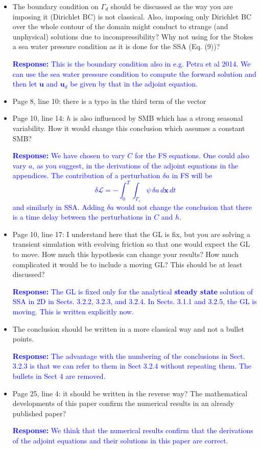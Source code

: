\documentclass{article}
\newcommand{\response}{\noindent{{\bf Response:} }}
\newcommand{\agreet}{\response  {\color{blue}{The correction has been made.}} }
\newcommand{\colorthree}{blue}
\newcommand{\revth}[1]{\noindent \textcolor{\colorthree}{{\bf Response:} #1}}
\begin{document}
\begin{itemize}
\revth{We have added `advection equation' and the boundary condition on $\Gamma_w$.}

\item The boundary condition on $\Gamma_d$ should be discussed as the way you are imposing it (Dirichlet BC) is not classical. Also, imposing only Dirichlet BC over the whole contour of the domain might conduct to strange (and unphysical) solutions due to incompressibility? Why not using for the Stokes a sea water pressure condition as it is done for the SSA (Eq. (9))?

\revth{This is the boundary condition also in e.g. Petra et al  2014. We can use the sea water pressure condition to compute the forward solution and then let $\mathbf u$ and ${\mathbf u}_d$ be given by that in the adjoint equation.}

\item Page 8, line 10: there is a typo in the third term of the vector

\agreet

\item Page 10, line 14: $h$ is also influenced by SMB which has a strong seasonal variability. How it would change this conclusion which assumes a constant SMB?

\revth{We have chosen to vary $C$ for the FS equations. One could also vary $a$, as you suggest, in the derivations of the adjoint equations in the appendices. The contribution of a perturbation $\delta a$ in FS will be
\[
   \delta{\mathcal L}=-\int_0^T\int_{\Gamma_s} \psi\, \delta a \,d{\mathbf x}\, dt
\]
and similarly in SSA.
Adding $\delta a$ would not change the conclusion that there is a time delay between the perturbations in $C$ and $h$.}

\item Page 10, line 17: I understand here that the GL is fix, but you are solving a transient simulation with evolving friction so that one would expect the GL to move. How much this hypothesis can change your results? How much complicated it would be to include a moving GL? This should be at least discussed?

\revth{The GL is fixed only for the analytical {\bf steady state} solution of SSA in 2D in Sects. 3.2.2, 3.2.3, and 3.2.4. In Sects. 3.1.1 and 3.2.5, the GL is moving. This is written explicitly now.}

\item The conclusion should be written in a more classical way and not a bullet points. 

\revth{The advantage with the numbering of the conclusions in Sect. 3.2.3 is that we can refer to them in Sect 3.2.4 without repeating them. The bullets in Sect 4 are removed.}

\item Page 25, line 4: it should be written in the reverse way? The mathematical developments of this paper confirm the numerical results in an already published paper?

\revth{We think that the numerical results confirm that the derivations of the adjoint equations and their solutions in this paper are correct.}

\end{itemize}
\end{document}

